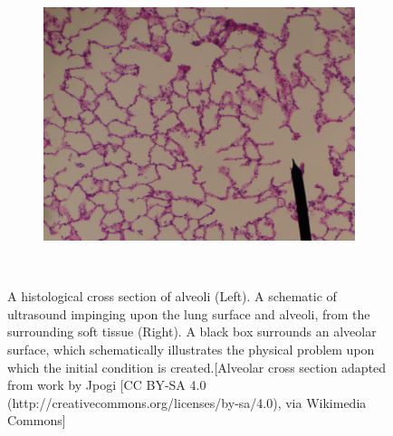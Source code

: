 \begin{figure}%
  \begin{subfigure}{0.45\textwidth}
    \centering%
    \includegraphics[width=\textwidth]{./figs/lung_figs/alveolar_sac}%
  \end{subfigure}
  ~
  \begin{subfigure}{0.5\textwidth}
  \end{subfigure}
  \caption[A histological cross section of alveoli.]{A histological
    cross section of alveoli (Left). A schematic of ultrasound
    impinging upon the lung surface and alveoli, from the surrounding
    soft tissue (Right). A black box surrounds an alveolar surface,
    which schematically illustrates the physical problem upon which
    the initial condition is created.[Alveolar cross section adapted
    from work by Jpogi [CC BY-SA 4.0
    (http://creativecommons.org/licenses/by-sa/4.0), via Wikimedia
    Commons]}%
  \label{fig:alveolar_histology}
\end{figure}%
